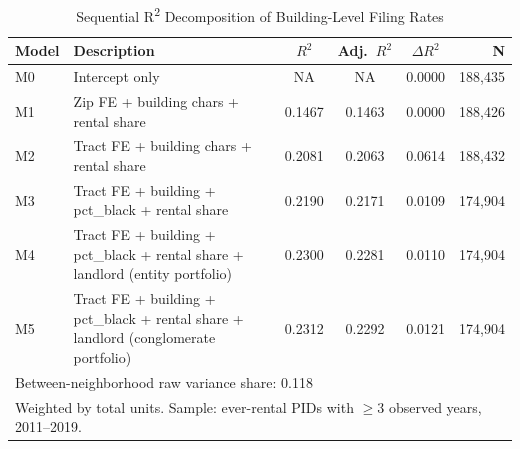 \begin{table}[htbp]
\centering
\caption{Sequential R\textsuperscript{2} Decomposition of Building-Level Filing Rates}
\label{tab:r2_decomp}
\begin{tabular}{p{2.4cm}p{7.5cm}cccr}
\hline
Model & Description & $R^2$ & Adj.~$R^2$ & $\Delta R^2$ & N \\
\hline
M0 & Intercept only & NA & NA & 0.0000 & 188,435 \\
M1 & Zip FE + building chars + rental share & 0.1467 & 0.1463 & 0.0000 & 188,426 \\
M2 & Tract FE + building chars + rental share & 0.2081 & 0.2063 & 0.0614 & 188,432 \\
M3 & Tract FE + building + pct_black + rental share & 0.2190 & 0.2171 & 0.0109 & 174,904 \\
M4 & Tract FE + building + pct_black + rental share + landlord (entity portfolio) & 0.2300 & 0.2281 & 0.0110 & 174,904 \\
M5 & Tract FE + building + pct_black + rental share + landlord (conglomerate portfolio) & 0.2312 & 0.2292 & 0.0121 & 174,904 \\
\hline
\multicolumn{6}{l}{\footnotesize Between-neighborhood raw variance share: 0.118} \\
\multicolumn{6}{l}{\footnotesize Weighted by total units. Sample: ever-rental PIDs with $\geq$3 observed years, 2011--2019.} \\
\end{tabular}
\end{table}
